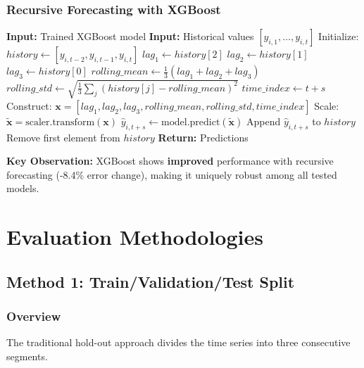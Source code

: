 \documentclass[12pt,a4paper]{article}
\begin{document}
\subsubsection{Recursive Forecasting with XGBoost}

\begin{algorithm}[H]
\caption{XGBoost Recursive Multi-Step Forecasting}
\begin{algorithmic}[1]
\State \textbf{Input:} Trained XGBoost model
\State \textbf{Input:} Historical values $[y_{i,1}, \ldots, y_{i,t}]$
\State Initialize: $history \gets [y_{i,t-2}, y_{i,t-1}, y_{i,t}]$
    \State $lag_1 \gets history[2]$
    \State $lag_2 \gets history[1]$
    \State $lag_3 \gets history[0]$
    \State $rolling\_mean \gets \frac{1}{3}(lag_1 + lag_2 + lag_3)$
    \State $rolling\_std \gets \sqrt{\frac{1}{3}\sum_{j}(history[j] - rolling\_mean)^2}$
    \State $time\_index \gets t + s$
    \State Construct: $\mathbf{x} = [lag_1, lag_2, lag_3, rolling\_mean, rolling\_std, time\_index]$
    \State Scale: $\tilde{\mathbf{x}} = \text{scaler.transform}(\mathbf{x})$
    \State $\hat{y}_{i,t+s} \gets \text{model.predict}(\tilde{\mathbf{x}})$
    \State Append $\hat{y}_{i,t+s}$ to $history$
    \State Remove first element from $history$
\EndFor
\State \textbf{Return:} Predictions
\end{algorithmic}
\end{algorithm}

\textbf{Key Observation:}
XGBoost shows \textbf{improved} performance with recursive forecasting (-8.4\% error change), making it uniquely robust among all tested models.

\section{Evaluation Methodologies}

\subsection{Method 1: Train/Validation/Test Split}

\subsubsection{Overview}

The traditional hold-out approach divides the time series into three consecutive segments.
\end{document}
